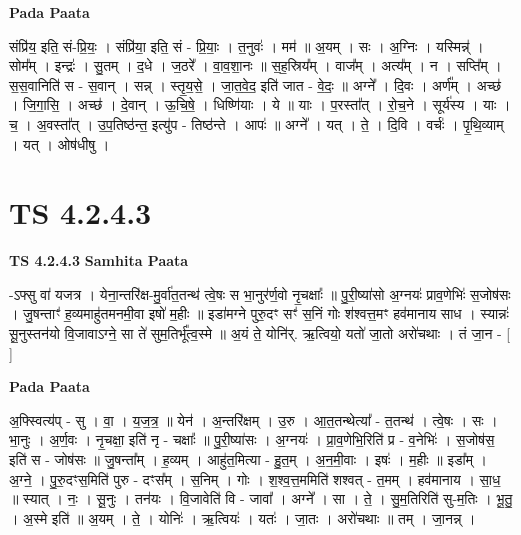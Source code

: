 \documentclass[17pt]{extarticle}
\begin{document}
\textbf{Pada Paata} \newline

संप्रि॑य॒ इति॒ सं-प्रि॒यः॒ । संप्रि॑या॒ इति॒ सं - प्रि॒याः॒ । त॒नुवः॑ । मम॑ ॥ अ॒यम् । सः । अ॒ग्निः । यस्मिन्न्॑ । सोम᳚म् । इन्द्रः॑ । सु॒तम् । द॒धे । ज॒ठरे᳚ । वा॒व॒शा॒नः ॥ स॒ह॒स्रिय᳚म् । वाज᳚म् । अत्य᳚म् । न । सप्ति᳚म् । स॒स॒वानिति॑ स - स॒वान् । सन्न् । स्तृ॒य॒से॒ । जा॒त॒वे॒द॒ इति॑ जात - वे॒दः॒ ॥ अग्ने᳚ । दि॒वः । अर्ण᳚म् । अच्छ॑ । जि॒गा॒सि॒ । अच्छ॑ । दे॒वान् । ऊ॒चि॒षे॒ । धिष्णि॑याः । ये ॥ याः । प॒रस्ता᳚त् । रो॒च॒ने । सूर्य॑स्य । याः । च॒ । अ॒वस्ता᳚त् । उ॒प॒तिष्ठ॑न्त॒ इत्यु॑प - तिष्ठ॑न्ते । आपः॑ ॥ अग्ने᳚ । यत् । ते॒ । दि॒वि । वर्चः॑ । पृ॒थि॒व्याम् । यत् । ओष॑धीषु ।  \newline





\section{ TS 4.2.4.3 }

\textbf{TS 4.2.4.3 } \newline
\textbf{Samhita Paata} \newline

-ऽफ्सु वा॑ यजत्र । येना॒न्तरि॑क्ष-मु॒र्वा॑त॒तन्थ॑ त्वे॒षः स भा॒नुर॑र्ण॒वो नृ॒चक्षाः᳚ ॥ पु॒री॒ष्या॑सो अ॒ग्नयः॑ प्राव॒णेभिः॑ स॒जोष॑सः । जु॒षन्ताꣳ॑ ह॒व्यमाहु॑तमनमी॒वा इषो॑ म॒हीः ॥ इडा॑मग्ने पुरु॒दꣳ सꣳ॑ स॒निं गोः श॑श्वत्त॒मꣳ हव॑मानाय साध । स्यान्नः॑ सू॒नुस्तन॑यो वि॒जावाऽग्ने॒ सा ते॑ सुम॒तिर्भू᳚त्व॒स्मे ॥ अ॒यं ते॒ योनि॑र्. ऋ॒त्वियो॒ यतो॑ जा॒तो अरो॑चथाः । तं जा॒न - [  ] \newline

\textbf{Pada Paata} \newline

अ॒फ्स्वित्य॑प् - सु । वा॒ । य॒ज॒त्र॒ ॥ येन॑ । अ॒न्तरि॑क्षम् । उ॒रु । आ॒त॒तन्थेत्या᳚ - त॒तन्थ॑ । त्वे॒षः । सः । भा॒नुः । अ॒र्ण॒वः । नृ॒चक्षा॒ इति॑ नृ - चक्षाः᳚ ॥ पु॒री॒ष्या॑सः । अ॒ग्नयः॑ । प्रा॒व॒णेभि॒रिति॑ प्र - व॒नेभिः॑ । स॒जोष॑स॒ इति॑ स - जोष॑सः ॥ जु॒षन्ता᳚म् । ह॒व्यम् । आहु॑त॒मित्या - हु॒त॒म् । अ॒न॒मी॒वाः । इषः॑ । म॒हीः ॥ इडा᳚म् । अ॒ग्ने॒ । पु॒रु॒दꣳस॒मिति॑ पुरु - दꣳस᳚म् । स॒निम् । गोः । श॒श्व॒त्त॒ममिति॑ शश्वत् - त॒मम् । हव॑मानाय । सा॒ध॒ ॥ स्यात् । नः॒ । सू॒नुः । तन॑यः । वि॒जावेति॑ वि - जावा᳚ । अग्ने᳚ । सा । ते॒ । सु॒म॒तिरिति॑ सु-म॒तिः । भू॒तु॒ । अ॒स्मे इति॑ ॥ अ॒यम् । ते॒ । योनिः॑ । ऋ॒त्वियः॑ । यतः॑ । जा॒तः । अरो॑चथाः ॥ तम् । जा॒नन्न् ।  \newline
\end{document}
